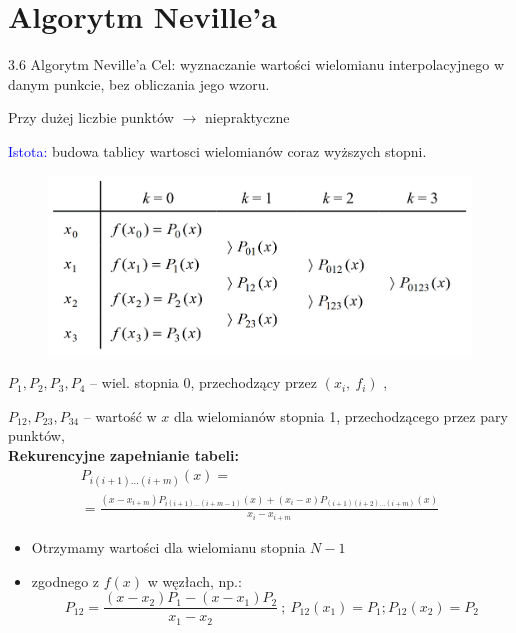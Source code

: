 \section{Algorytm Neville'a}
\begin{frame}
{3.6 Algorytm Neville'a}
 Cel: wyznaczanie wartości wielomianu interpolacyjnego  w danym punkcie, bez obliczania jego wzoru.
 
 Przy dużej liczbie punktów $\rightarrow$ niepraktyczne

\textcolor{blue}{Istota:} budowa tablicy wartosci wielomianów coraz wyższych stopni.
\begin{figure}[h]
			\includegraphics[scale = 0.28]{img/3/interpol_3_6}
\label{Ilustracja metody Neville'a}	
\end{figure}
\end{frame}

\begin{frame}
$P_{1}, P_{2}, P_{3}, P_{4}$ -- wiel. stopnia $0$, przechodzący przez $(x_{i},\ f_{i})$ ,

$P_{12}, P_{23}, P_{34}$ -- wartość w $x$ dla wielomianów stopnia 1, przechodzącego przez pary punktów, \\
\vspace{4mm}
\textbf{Rekurencyjne zapełnianie tabeli:}
\begin{gather*}
	P_{i(i+1)\ldots(i+m)}(x)=\\
	=\displaystyle \frac{(x-x_{i+m})P_{i(i+1)\ldots(i+m-1)}(x)+(x_{i}-x)P_{(i+1)(i+2)\ldots(i+m)}(x)}{x_{i}-x_{i+m}}
\end{gather*}

\begin{itemize}
\item Otrzymamy wartości dla wielomianu stopnia $N-1$

\item zgodnego z $f(x)$ w węzłach, np.:
$$
P_{12}=\frac{(x-x_{2})P_{1}-(x-x_{1})P_{2}}{x_{1}-x_{2}}\ ;\ P_{12}(x_{1})=P_{1};P_{12}(x_{2})=P_{2}
$$

\end{itemize}

\end{frame}

